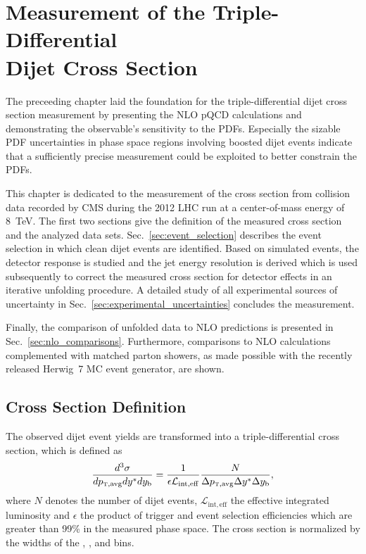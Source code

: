 
\chapter[Measurement of the Triple-Differential Dijet Cross Section]{Measurement
of the Triple-Differential\\ Dijet Cross Section}
\label{sec:measurement}

The preceeding chapter laid the foundation for the triple-differential dijet
cross section measurement by presenting the NLO pQCD calculations and
demonstrating the observable's sensitivity to the PDFs. Especially the sizable
PDF uncertainties in phase space regions involving boosted dijet events indicate
that a sufficiently precise measurement could be exploited to better constrain
the PDFs. 

This chapter is dedicated to the measurement of the cross section from collision
data recorded by CMS during the 2012 LHC run at a center-of-mass energy of
\SI{8}{\TeV}. The first two sections give the definition of the measured cross
section and the analyzed data sets. Sec.~\ref{sec:event_selection} describes the
event selection in which clean dijet events are identified. Based on simulated
events, the detector response is studied and the jet energy resolution is derived
which is used subsequently to correct the measured cross section for detector
effects in an iterative unfolding procedure. A detailed study of all
experimental sources of uncertainty in Sec.~\ref{sec:experimental_uncertainties}
concludes the measurement.

Finally, the comparison of unfolded data to NLO predictions is presented in
Sec.~\ref{sec:nlo_comparisons}. Furthermore, comparisons to NLO calculations
complemented with matched parton showers, as made possible with the recently
released Herwig~7 MC event generator, are shown.
~

\section{Cross Section Definition}

The observed dijet event yields are transformed into a triple-differential
cross section, which is defined as
%
\begin{equation*}
    \frac{d^3 \sigma}{d \ptavg d \ystar d \yboost} = \frac{1}{\epsilon
        \mathcal{L}_{\mathrm{int, eff}}} \frac{N}{\Delta \ptavg \Delta \ystar
        \Delta \yboost},
\end{equation*}
%
where $N$ denotes the number of dijet events, $\mathcal{L}_{\mathrm{int, eff}}$
the effective integrated luminosity and $\epsilon$ the product of trigger and
event selection efficiencies which are greater than 99\% in the measured phase
space. The cross section is normalized by the widths of the \ptavg, \ystar, and
\yboost bins. 

